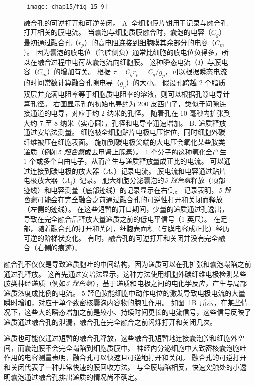 \begin{figure}[htbp]
	\centering
	\texttt{[image: chap15/fig\_15\_9]}
	\caption{融合孔的可逆打开和可逆关闭。
		A. 全细胞膜片钳用于记录与融合孔打开相关的膜电流。
		当囊泡与细胞质膜融合时，囊泡的电容（$C_g$）最初通过融合孔（$r_p$）的高电阻连接到细胞膜其余部分的电容（$C_m$）。
		因为囊泡的膜电位（管腔侧负）通常比细胞的膜电位负得多，所以在融合过程中电荷从囊泡流向细胞膜。
		这种瞬态电流（$I$）与膜电容（$C_m$）的增加有关。
		根据 $\tau = C_g r_p = C_g / g_p$，可以根据瞬态电流的时间常数计算融合孔隙电导（$g_p$）的大小。
		假设孔跨越 2 个脂质双层并充满电阻率等于细胞质电阻率的溶液，则可以根据孔隙电导计算孔径。
		右图显示孔的初始电导约为 200 皮西门子，类似于间隙连接通道的电导，对应于约 2 纳米的孔径。
		随着孔在 10 毫秒内扩张到大约 7 至 8 纳米（实心圆），孔径和电导率迅速增加\cite{monck1992exocytotic,spruce1990properties}。
		B. 递质释放通过安培法测量。
		细胞被全细胞贴片电极电压钳位，同时细胞外碳纤维被压在细胞表面。
		施加到碳电极尖端的大电压会氧化某些胺类递质（例如\textit{5-羟色氨}或去甲肾上腺素）。
		1 个分子的这种氧化会产生 1 个或多个自由电子，从而产生与递质释放量成正比的电流。
		可以通过连接到碳电极的放大器（$A_2$）记录电流。
		膜电流和电容通过贴片电极放大器（$A_1$）记录。
		肥大细胞分泌囊泡的\textit{5-羟色氨}释放（顶部迹线）和电容测量（底部迹线）的记录显示在右侧。
		记录表明，\textit{5-羟色氨}可能会在完全融合之前通过融合孔的可逆性打开和关闭而释放（左侧的迹线）。
		在这些短暂的开口期间，少量的递质通过孔逸出，导致在完全融合后释放大量递质之前的低电平信号（1 英尺）。
		在足部，随着融合孔的打开和关闭，细胞表面积（与膜电容成正比）经历可逆的阶梯状变化。
		有时，融合孔的可逆打开和关闭并没有完全融合（右侧的痕迹）。}
	\label{fig:15_9}
\end{figure}


融合孔不仅仅是导致递质胞吐的中间结构，因为递质可以在孔扩张和囊泡塌陷之前通过孔释放。
这首先通过安培法显示，这种方法使用细胞外碳纤维电极检测某些胺类神经递质（例如\textit{5-羟色氨}），基于递质和电极之间的电化学反应，产生与局部递质浓度成比例的电流。
5-羟色胺能细胞中动作电位的激发导致电极电流的大量瞬时增加，对应于单个致密核囊泡内容物的胞吐作用。
如图~\ref{fig:15_9}B~所示，在某些情况下，这些大的瞬态增加之前是较小、持续时间更长的电流信号，这些信号反映了递质通过融合孔的泄漏，融合孔在完全融合之前闪烁打开和关闭几次。


递质也可能仅通过短暂的融合孔释放，这些融合孔短暂地连接囊泡腔和细胞外空间，而囊泡膜不会完全塌陷到细胞质膜中。
神经内分泌细胞中大致密核囊泡胞吐作用的电容测量表明，融合孔可以快速且可逆地打开和关闭。
融合孔的可逆打开和关闭代表了一种非常快速的膜回收方法。
与全膜塌陷相反，快速突触处的小透明囊泡通过融合孔排出递质的情况尚不确定。



